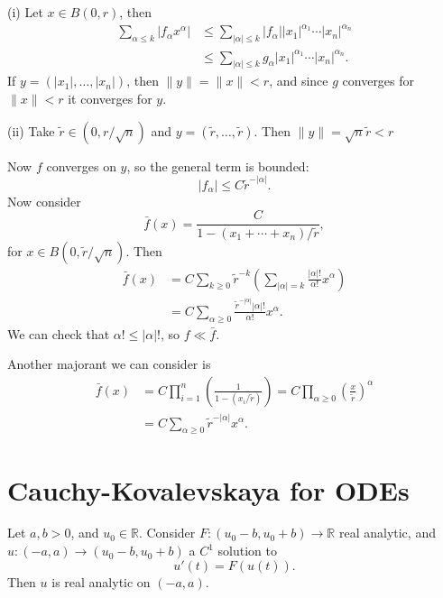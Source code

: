 \documentclass[12pt]{article}
\begin{document}
\begin{proofbox}
	

	(i) Let $x \in B(0, r)$, then
	\begin{align*}
		\sum_{\alpha \leq k} |f_\alpha x^\alpha| &\leq \sum_{|\alpha| \leq k} |f_\alpha| |x_1|^{\alpha_1} \cdots |x_n|^{\alpha_n} \\
							 &\leq \sum_{|\alpha| \leq k} g_\alpha |x_1|^{\alpha_1} \cdots |x_n|^{\alpha_n}.
	\end{align*}
	If $y = (|x_1|, \ldots, |x_n|)$, then $\|y\| = \|x\| < r$, and since $g$ converges for $\|x\| < r$ it converges for $y$.

	(ii) Take $\tilde r \in (0, r/\sqrt n)$ and $y = (\tilde r, \ldots, \tilde r)$. Then $\|y\| = \sqrt n \tilde r < r$ 

	Now $f$ converges on $y$, so the general term is bounded:
	\[
	|f_\alpha| \leq C \tilde r^{-|\alpha|}.
	\]
	Now consider
	\[
	\bar f(x) = \frac{C}{1 - (x_1 + \cdots + x_n)/\tilde r},
	\]
	for $x \in B(0, \tilde r/\sqrt n)$. Then
	\begin{align*}
		\bar f(x) &= C \sum_{k \geq 0} \tilde r^{-k} \left( \sum_{|\alpha| = k} \frac{|\alpha|!}{\alpha!} x^\alpha \right) \\
			  &= C \sum_{\alpha \geq 0} \frac{\tilde r^{-|\alpha|} |\alpha|!}{\alpha!} x^\alpha.
	\end{align*}
	We can check that $\alpha! \leq |\alpha|!$, so $f \ll \bar f$.

	Another majorant we can consider is
	\begin{align*}
		\bar f(x) &= C \prod_{i = 1}^n \left( \frac{1}{1 - (x_i/\tilde r)} \right) = C \prod_{\alpha \geq 0} \left( \frac{x}{\tilde r} \right)^{\alpha} \\
			  &= C \sum_{\alpha \geq 0} \tilde r^{-|\alpha|} x^\alpha.
	\end{align*}
\end{proofbox}

\newpage

\section{Cauchy-Kovalevskaya for ODEs}%
\label{sec:ck_ode}

\begin{theorem}
	Let $a, b > 0$, and $u_0 \in \mathbb{R}$. Consider $F : (u_0 - b, u_0 + b) \to \mathbb{R}$ real analytic, and $u : (-a, a) \to (u_0 - b, u_0 + b)$ a $C^1$ solution to
	\[
	u'(t) = F(u(t)).
	\]
	Then $u$ is real analytic on $(-a, a)$.
\end{theorem}
\end{document}
